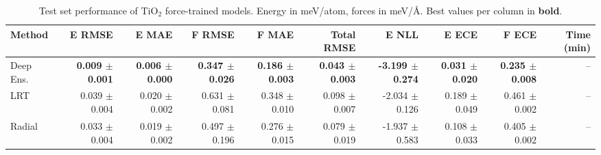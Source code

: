 \begin{table}
\centering
\caption{Test set performance of TiO$_2$ force-trained models. Energy in meV/atom, forces in meV/\AA{}. Best values per column in \textbf{bold}.}
\label{tab:tio2_results}
\begin{tabular}{lrrrrrrrrr}
\toprule
Method & E RMSE & E MAE & F RMSE & F MAE & Total RMSE & E NLL & E ECE & F ECE & Time (min) \\
\midrule
Deep Ens. & \textbf{0.009 $\pm$ 0.001} & \textbf{0.006 $\pm$ 0.000} & \textbf{0.347 $\pm$ 0.026} & \textbf{0.186 $\pm$ 0.003} & \textbf{0.043 $\pm$ 0.003} & \textbf{-3.199 $\pm$ 0.274} & \textbf{0.031 $\pm$ 0.020} & \textbf{0.235 $\pm$ 0.008} & -- \\
LRT & 0.039 $\pm$ 0.004 & 0.020 $\pm$ 0.002 & 0.631 $\pm$ 0.081 & 0.348 $\pm$ 0.010 & 0.098 $\pm$ 0.007 & -2.034 $\pm$ 0.126 & 0.189 $\pm$ 0.049 & 0.461 $\pm$ 0.002 & -- \\
Radial & 0.033 $\pm$ 0.004 & 0.019 $\pm$ 0.002 & 0.497 $\pm$ 0.196 & 0.276 $\pm$ 0.015 & 0.079 $\pm$ 0.019 & -1.937 $\pm$ 0.583 & 0.108 $\pm$ 0.033 & 0.405 $\pm$ 0.002 & -- \\
\bottomrule
\end{tabular}
\end{table}